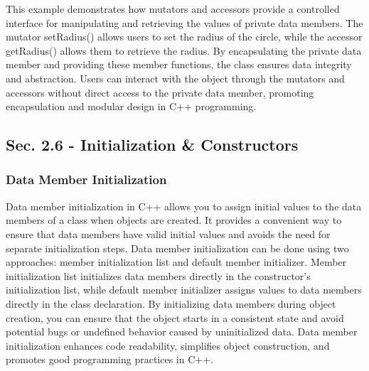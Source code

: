\begin{solution}
    \noindent This example demonstrates how mutators and accessors provide a controlled interface for manipulating and retrieving the values of private data members. The mutator setRadius() allows users to set the radius 
    of the circle, while the accessor getRadius() allows them to retrieve the radius. By encapsulating the private data member and providing these member functions, the class ensures data integrity and abstraction. Users 
    can interact with the object through the mutators and accessors without direct access to the private data member, promoting encapsulation and modular design in C++ programming. \\
\end{solution}

\subsection*{Sec. 2.6 - Initialization \& Constructors}
\subsubsection*{Data Member Initialization}

Data member initialization in C++ allows you to assign initial values to the data members of a class when objects are created. It provides a convenient way to ensure that data members have valid initial values and avoids 
the need for separate initialization steps. Data member initialization can be done using two approaches: member initialization list and default member initializer. Member initialization list initializes data members directly 
in the constructor's initialization list, while default member initializer assigns values to data members directly in the class declaration. By initializing data members during object creation, you can ensure that the object 
starts in a consistent state and avoid potential bugs or undefined behavior caused by uninitialized data. Data member initialization enhances code readability, simplifies object construction, and promotes good programming 
practices in C++. \\

